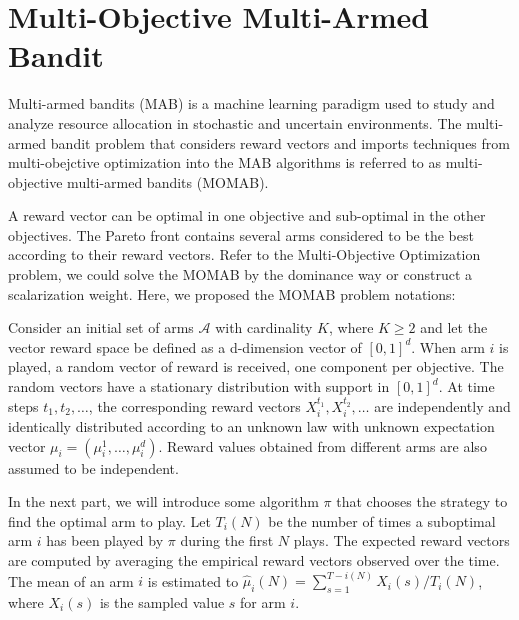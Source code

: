 \section{Multi-Objective Multi-Armed Bandit}
\label{MOMAB2}
Multi-armed bandits (MAB) is a machine learning paradigm used to study and analyze resource allocation in stochastic and uncertain environments. The multi-armed bandit problem that considers reward vectors and imports techniques from multi-obejctive optimization into the MAB algorithms is referred to as multi-objective multi-armed bandits (MOMAB).

A reward vector can be optimal in one objective and sub-optimal in the other objectives. The Pareto front contains several arms considered to be the best according to their reward vectors. Refer to the Multi-Objective Optimization problem, we could solve the MOMAB by the dominance way or construct a scalarization weight. Here, we proposed the MOMAB problem notations:

Consider an initial set of arms $\mathscr{A}$ with cardinality $K$, where $K\geqslant 2$ and let the vector reward space be defined as a d-dimension vector of $[0,1]^d$. When arm $i$ is played, a random vector of reward is received, one component per objective. The random vectors have a stationary distribution with support in $[0,1]^d$. At time steps $t_1,t_2,\dots$, the corresponding reward vectors $X_i^{t_1},X_i^{t_2},\dots$ are independently and identically distributed according to an unknown law with unknown expectation vector $\mu_i = (\mu_i^1,\dots,\mu_i^d)$. Reward values obtained from different arms are also assumed to be independent. 

In the next part, we will introduce some algorithm $\pi$ that chooses the strategy to find the optimal arm to play. Let $T_i(N)$ be the number of times a suboptimal arm $i$ has been played by $\pi$ during the first $N$ plays. The expected reward vectors are computed by averaging the empirical reward vectors observed over the time. The mean of an arm $i$ is estimated to $\hat{\mu}_i(N) = \sum_{s=1}^{T-i(N)}X_i(s)/T_i(N)$, where $X_i(s)$ is the sampled value $s$ for arm $i$.


